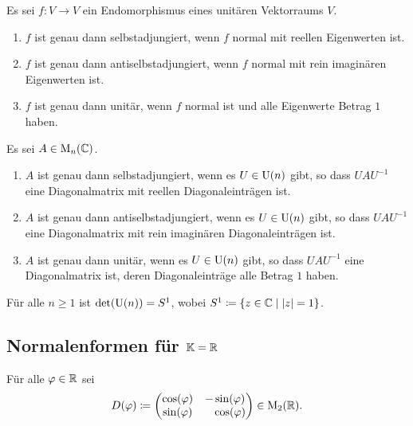 \begin{proposition}
  Es sei $f \colon V \to V$ ein Endomorphismus eines unitären Vektorraums $V$.
  \begin{enumerate}[leftmargin=*, label=\roman*)]
    \item
      $f$ ist genau dann selbstadjungiert, wenn $f$ normal mit reellen Eigenwerten ist.
    \item
      $f$ ist genau dann antiselbstadjungiert, wenn $f$ normal mit rein imaginären Eigenwerten ist.
    \item
      $f$ ist genau dann unitär, wenn $f$ normal ist und alle Eigenwerte Betrag $1$ haben.
  \end{enumerate}
\end{proposition}


\begin{corollary}
  Es sei $A \in \mathrm{M}_n(\mathbb{C})$.
  \begin{enumerate}[leftmargin=*, label=\roman*)]
    \item
      $A$ ist genau dann selbstadjungiert, wenn es $U \in \mathrm{U}(n)$ gibt, so dass $U\!A U^{-1}$ eine Diagonalmatrix mit reellen Diagonaleinträgen ist.
    \item
      $A$ ist genau dann antiselbstadjungiert, wenn es $U \in \mathrm{U}(n)$ gibt, so dass $U\!A U^{-1}$ eine Diagonalmatrix mit rein imaginären Diagonaleinträgen ist.
    \item
      $A$ ist genau dann unitär, wenn es $U \in \mathrm{U}(n)$ gibt, so dass $U\!A U^{-1}$ eine Diagonalmatrix ist, deren Diagonaleinträge alle Betrag $1$ haben.
  \end{enumerate}
\end{corollary}


\begin{corollary}
  Für alle $n \geq 1$ ist $\det(\mathrm{U}(n)) = S^1$, wobei $S^1 \coloneqq \{z \in \mathbb{C} \mid |z| = 1\}$.
\end{corollary}










\subsection{Normalenformen für \texorpdfstring{$\mathbb{K} = \mathbb{R}$}{K = R}}


\begin{notation}
  Für alle $\varphi \in \mathbb{R}$ sei
  \[
    D(\varphi)
    \coloneqq
    \begin{pmatrix}
      \cos(\varphi) &          - \sin(\varphi)  \\
      \sin(\varphi) & \phantom{-}\cos(\varphi)
    \end{pmatrix}
    \in
    \mathrm{M}_2(\mathbb{R}).
  \]
\end{notation}


